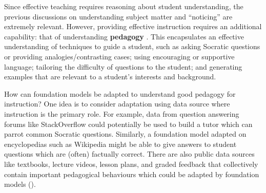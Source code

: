 Since effective teaching requires reasoning about student understanding, the previous discussions on understanding subject matter and ``noticing'' are extremely relevant. However, providing effective instruction requires an additional capability: that of understanding \textbf{pedagogy} \cite{mckenzie2003pedagogy}. This encapsulates an effective understanding of techniques to guide a student, such as asking Socratic questions or providing analogies/contrasting cases; using encouraging or supportive language; tailoring the difficulty of questions to the student; and generating examples that are relevant to a student's interests and background.

How can foundation models be adapted to understand good pedagogy for instruction? One idea is to consider adaptation using data source where instruction is the primary role. For example, data from question answering forums like StackOverflow could potentially be used to build a tutor which can parrot common Socratic questions. Similarly, a foundation model adapted on encyclopedias such as Wikipedia might be able to give answers to student questions which are (often) factually correct. There are also public data sources like textbooks, lecture videos, lesson plans, and graded feedback that collectively contain important pedagogical behaviours which could be adapted by foundation models ().






